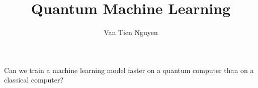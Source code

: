 \documentclass{article}
\title{Quantum Machine Learning}
\author{Van Tien Nguyen}
\begin{document}
\maketitle
Can we train a machine learning model faster on a quantum computer than on a classical computer?
\end{document}
